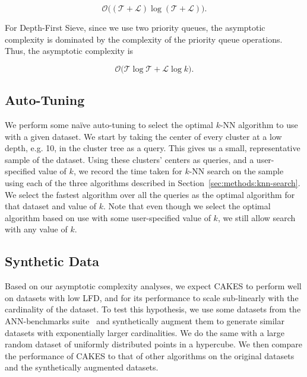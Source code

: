 \begin{equation}
    \mathcal{O} \Big( ( \mathcal{T} + \mathcal{L} ) \log ( \mathcal{T} + \mathcal{L} ) \Big).
    \label{eq:methods:breadth-first-sieve-complexity}
\end{equation}

For Depth-First Sieve, since we use two priority queues, the asymptotic complexity is dominated by the complexity of the priority queue operations.
Thus, the asymptotic complexity is

\begin{equation}
    \mathcal{O} \Big( \mathcal{T} \log \mathcal{T} + \mathcal{L} \log k \Big).
    \label{eq:methods:depth-first-sieve-complexity}
\end{equation}


\subsection{Auto-Tuning}
\label{sec:methods:auto-tuning}

We perform some na\"{i}ve auto-tuning to select the optimal $k$-NN algorithm to use with a given dataset.
We start by taking the center of every cluster at a low depth, e.g. 10, in the cluster tree as a query.
This gives us a small, representative sample of the dataset.
Using these clusters' centers as queries, and a user-specified value of $k$, we record the time taken for $k$-NN search on the sample using each of the three algorithms described in Section~\ref{sec:methods:knn-search}.
We select the fastest algorithm over all the queries as the optimal algorithm for that dataset and value of $k$.
Note that even though we select the optimal algorithm based on use with some user-specified value of $k$, we still allow search with any value of $k$.


\subsection{Synthetic Data}
\label{sec:methods:synthetic-data}

Based on our asymptotic complexity analyses, we expect CAKES to perform well on datasets with low LFD, and for its performance to scale sub-linearly with the cardinality of the dataset.
To test this hypothesis, we use some datasets from the ANN-benchmarks suite~\cite{aumuller2020ann} and synthetically augment them to generate similar datasets with exponentially larger cardinalities.
We do the same with a large random dataset of uniformly distributed points in a hypercube.
We then compare the performance of CAKES to that of other algorithms on the original datasets and the synthetically augmented datasets.

